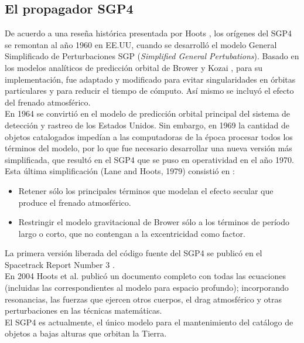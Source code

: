 {\subsection{El propagador SGP4}\label{subsec:sgp4model}
De acuerdo a una rese\~na hist\'orica presentada por Hoots \citep{hootshistoria}, los or\'igenes del SGP4 se remontan al a\~no 1960 en EE.UU, cuando se desarroll\'o el modelo General Simplificado de Perturbaciones SGP  ({\it{Simplified General Pertubations}}). Basado en los modelos anal\'iticos de predicci\'on orbital de Brower \citep{brouwer1959solution} y Kozai \citep{kozai1962second}, para su implementaci\'on, fue adaptado y modificado para evitar singularidades en \'orbitas particulares y para reducir el tiempo de c\'omputo. As\'i mismo se incluy\'o el efecto del frenado atmosf\'erico.\\
En 1964 se convirti\'o en el modelo de predicci\'on orbital principal del sistema de detecci\'on y rastreo de los Estados Unidos.
Sin embargo, en 1969 la cantidad de objetos catalogados imped\'ian a las computadoras de la \'epoca procesar todos los t\'erminos del modelo, por lo que fue necesario desarrollar una nueva versi\'on m\'as simplificada, que result\'o en el SGP4 que se puso en operatividad en el a\~no 1970.\\

Esta \'ultima simplificaci\'on (Lane and Hoots, 1979) consisti\'o en :\\
\begin{itemize}
 \item Retener s\'olo los principales t\'erminos que modelan el efecto secular que produce el frenado atmosf\'erico.
 \item Restringir el modelo gravitacional de Brower s\'olo a los t\'erminos de per\'iodo largo o corto, que no contengan a la excentricidad como factor.
\end{itemize}

La primera versi\'on liberada del c\'odigo fuente del SGP4 se public\'o en el Spacetrack Report Number 3 \citep{spacetrackreport3}.\\
En 2004 Hoots et al. public\'o un documento completo con todas las ecuaciones (incluidas las correspondientes al modelo para espacio profundo); incorporando resonancias, las fuerzas que ejercen otros cuerpos, el drag atmosf\'erico y otras perturbaciones en las t\'ecnicas matem\'aticas.\\

El SGP4 es actualmente, el \'unico modelo para el mantenimiento del cat\'alogo de objetos a bajas alturas que orbitan la Tierra. 

}
